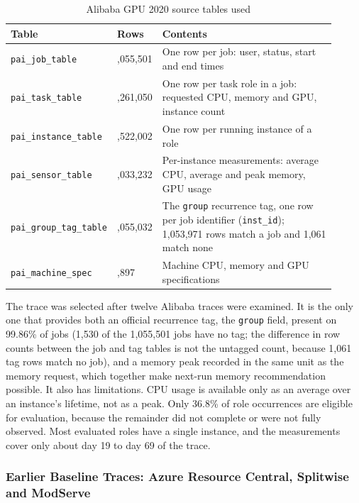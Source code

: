 \documentclass{IEEEtran}
\begin{document}
\begin{table}[!t]
\centering
\footnotesize
\caption{Alibaba GPU 2020 source tables used}\label{tab:3.2}
\begin{tabular}{>{\raggedright\arraybackslash}p{0.206\linewidth}>{\raggedright\arraybackslash}p{0.077\linewidth}>{\raggedright\arraybackslash}p{0.627\linewidth}}
\hline
\textbf{Table} & \textbf{Rows} & \textbf{Contents} \\ \hline
\texttt{pai\_job\_table} & 1,055,501 & One row per job: user, status, start and end times \\
\texttt{pai\_task\_table} & 1,261,050 & One row per task role in a job: requested CPU, memory and GPU, instance count \\
\texttt{pai\_instance\_table} & 7,522,002 & One row per running instance of a role \\
\texttt{pai\_sensor\_table} & 3,033,232 & Per-instance measurements: average CPU, average and peak memory, GPU usage \\
\texttt{pai\_group\_tag\_table} & 1,055,032 & The \texttt{group} recurrence tag, one row per job identifier (\texttt{inst\_id}); 1,053,971 rows match a job and 1,061 match none \\
\texttt{pai\_machine\_spec} & 1,897 & Machine CPU, memory and GPU specifications \\
\hline
\end{tabular}
\end{table}

The trace was selected after twelve Alibaba traces were examined. It is the only one that provides both an official recurrence tag, the \texttt{group} field, present on 99.86\% of jobs (1,530 of the 1,055,501 jobs have no tag; the difference in row counts between the job and tag tables is not the untagged count, because 1,061 tag rows match no job), and a memory peak recorded in the same unit as the memory request, which together make next-run memory recommendation possible. It also has limitations. CPU usage is available only as an average over an instance's lifetime, not as a peak. Only 36.8\% of role occurrences are eligible for evaluation, because the remainder did not complete or were not fully observed. Most evaluated roles have a single instance, and the measurements cover only about day 19 to day 69 of the trace.

\subsubsection{Earlier Baseline Traces: Azure Resource Central, Splitwise and ModServe}\label{sec:3.3.3}
\end{document}
